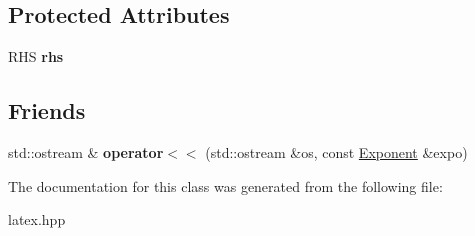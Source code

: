 \subsection*{Protected Attributes}
\begin{DoxyCompactItemize}
\item 
\hypertarget{classlatex_1_1math_1_1Exponent_a408db407a8b005fcbbd76aebe44bbb65}{R\-H\-S {\bfseries rhs}}\label{classlatex_1_1math_1_1Exponent_a408db407a8b005fcbbd76aebe44bbb65}

\end{DoxyCompactItemize}
\subsection*{Friends}
\begin{DoxyCompactItemize}
\item 
\hypertarget{classlatex_1_1math_1_1Exponent_a56873f9cc4a3a04da6c90eb781512537}{std\-::ostream \& {\bfseries operator$<$$<$} (std\-::ostream \&os, const \hyperlink{classlatex_1_1math_1_1Exponent}{Exponent} \&expo)}\label{classlatex_1_1math_1_1Exponent_a56873f9cc4a3a04da6c90eb781512537}

\end{DoxyCompactItemize}


The documentation for this class was generated from the following file\-:\begin{DoxyCompactItemize}
\item 
latex.\-hpp\end{DoxyCompactItemize}
